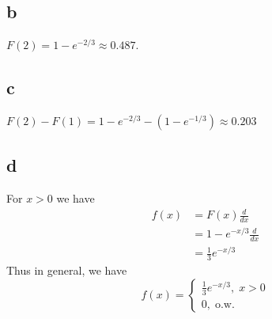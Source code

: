 \documentclass[10pt]{article}
\begin{document}
\subsection*{b}
$F(2)=1-e^{-2/3}\approx0.487.$
\subsection*{c}
$F(2)-F(1)=1-e^{-2/3}-(1-e^{-1/3})\approx0.203$
\subsection*{d}
For $x>0$ we have
\begin{align*}
    f(x) &= F(x)\frac{d}{dx}\\
    &= 1-e^{-x/3}\frac{d}{dx}\\
    &=\frac{1}{3}e^{-x/3}
\end{align*}
Thus in general, we have
\begin{equation*}
    f(x)=\begin{cases}
        \frac{1}{3}e^{-x/3},\; x>0\\
        0,\; \text{o.w.}
    \end{cases}
\end{equation*}
\end{document}
